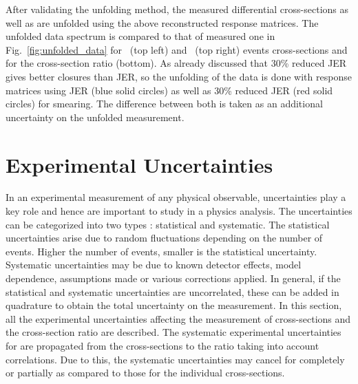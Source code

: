 After validating the unfolding method, the measured differential cross-sections as well as \ratio are unfolded using the above reconstructed response matrices. The unfolded data spectrum is compared to that of measured one in Fig.~\ref{fig:unfolded_data} for \njt~(top left) and \njth~(top right) events cross-sections and for the cross-section ratio \ratio (bottom). As already discussed that 30\% reduced JER gives better closures than JER, so the unfolding of the data is done with response matrices using JER (blue solid circles) as well as 30\% reduced JER (red solid circles) for smearing. The difference between both is taken as an additional uncertainty on the unfolded measurement. %


\section{Experimental Uncertainties}
\label{sec:exp_unc}
In an experimental measurement of any physical observable, uncertainties play a key role and hence are important to study in a physics analysis. The uncertainties can be categorized into two types : statistical and systematic. The statistical uncertainties arise due to random fluctuations depending on the number of events. Higher the number of events, smaller is the statistical uncertainty. Systematic uncertainties may be due to known detector effects, model dependence, assumptions made or various corrections applied. In general, if the statistical and systematic uncertainties are uncorrelated, these can be added in quadrature to obtain the total uncertainty on the measurement. In this section, all the experimental uncertainties affecting the measurement of cross-sections and the cross-section ratio \ratio are described. The systematic experimental uncertainties for \ratio are propagated from the cross-sections to the ratio taking into account correlations. Due to this, the systematic uncertainties may cancel for \ratio completely or partially as compared to those for the individual cross-sections.

